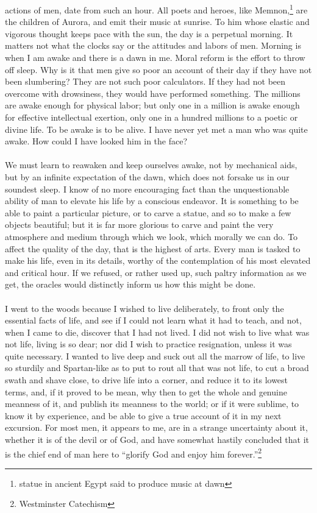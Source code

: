 \documentclass[letterpaper,12pt]{article}
\begin{document}
actions of men, date from such an hour.  All poets and heroes, like
Memnon,\footnote{statue in ancient Egypt said to produce music at dawn} are the
children of Aurora, and emit their music at sunrise. To him whose elastic and
vigorous thought keeps pace with the sun, the day is a perpetual morning. It
matters not what the clocks say or the attitudes and labors of men. Morning is
when I am awake and there is a dawn in me. Moral reform is the effort to throw
off sleep. Why is it that men give so poor an account of their day if they have
not been slumbering? They are not such poor calculators. If they had not been
overcome with drowsiness, they would have performed something. The millions are
awake enough for physical labor; but only one in a million is awake enough for
effective intellectual exertion, only one in a hundred millions to a poetic or
divine life. To be awake is to be alive. I have never yet met a man who was
quite awake. How could I have looked him in the face?

\paragraph{} We must learn to reawaken and keep ourselves awake, not by
mechanical aids, but by an infinite expectation of the dawn, which does not
forsake us in our soundest sleep. I know of no more encouraging fact than the
unquestionable ability of man to elevate his life by a conscious endeavor. It is
something to be able to paint a particular picture, or to carve a statue, and so
to make a few objects beautiful; but it is far more glorious to carve and paint
the very atmosphere and medium through which we look, which morally we can do.
To affect the quality of the day, that is the highest of arts. Every man is
tasked to make his life, even in its details, worthy of the contemplation of his
most elevated and critical hour. If we refused, or rather used up, such paltry
information as we get, the oracles would distinctly inform us how this might be
done.

\paragraph{} I went to the woods because I wished to live deliberately, to front
only the essential facts of life, and see if I could not learn what it had to
teach, and not, when I came to die, discover that I had not lived. I did not
wish to live what was not life, living is so dear; nor did I wish to practice
resignation, unless it was quite necessary. I wanted to live deep and suck out
all the marrow of life, to live so sturdily and Spartan-like as to put to rout
all that was not life, to cut a broad swath and shave close, to drive life into
a corner, and reduce it to its lowest terms, and, if it proved to be mean, why
then to get the whole and genuine meanness of it, and publish its meanness to
the world; or if it were sublime, to know it by experience, and be able to give
a true account of it in my next excursion. For most men, it appears to me, are
in a strange uncertainty about it, whether it is of the devil or of God, and
have somewhat hastily concluded that it is the chief end of man here to
\enquote{glorify God and enjoy him forever.}\footnote{Westminster Catechism}
\end{document}
